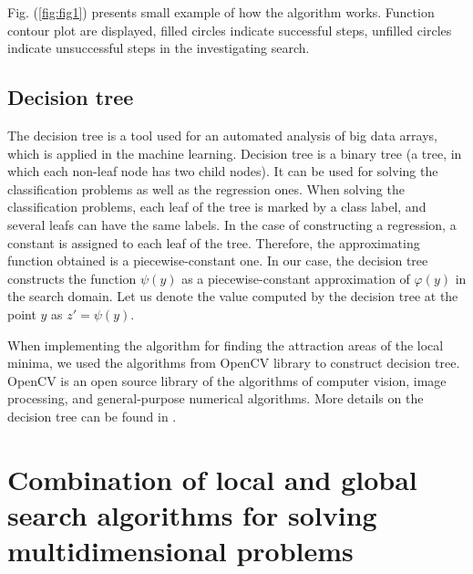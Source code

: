 \documentclass{svproc}
\begin{document}
 Fig. (\ref{fig:fig1}) presents small example of how the algorithm works. Function contour plot are displayed, filled circles indicate successful steps, unfilled circles indicate unsuccessful steps in the investigating search.

\subsection{Decision tree}\label{SecDT}

The decision tree is a tool used for an automated analysis of big data arrays, which is applied in the  machine learning. Decision tree is a binary tree (a tree, in which each non-leaf node has two child nodes). It can be used for solving the classification problems as well as the regression ones. When solving  the classification problems, each leaf of the tree is marked by a class label, and several leafs can have  the same labels. In the case of constructing a regression, a constant is assigned to each leaf of the tree.   Therefore, the approximating function obtained is a piecewise-constant one. In our case, the decision tree constructs the function $\psi(y)$ as a piecewise-constant  approximation of $\varphi(y)$ in the search domain. Let us denote the value  computed by the  decision tree at the point $y$ as $z' = \psi(y)$.

When implementing the algorithm for finding the attraction areas of the local  minima, we used the algorithms from OpenCV library to construct decision tree. OpenCV is an open source library of the algorithms of computer vision, image processing, and  general-purpose numerical algorithms. More details on the decision tree can be found  in \cite{Brahmbhatt2013}.

\section{Combination of local and global search algorithms for solving multidimensional  problems}\label{SecGSAL}
\end{document}
